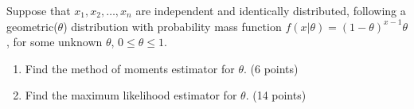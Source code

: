 \item Suppose that $x_1, x_2, \ldots, x_n$ are independent and identically distributed, following a geometric($\theta$) distribution with probability mass function $f(x|\theta)=(1-\theta)^{x-1}\theta$, for some unknown $\theta$, $0\leq\theta\leq1$. 

\begin{enumerate}
\item Find the method of moments estimator for $\theta$. (6 points) \\
\vfill


\item Find the maximum likelihood estimator for $\theta$. (14 points) \\
\vfill

\end{enumerate}